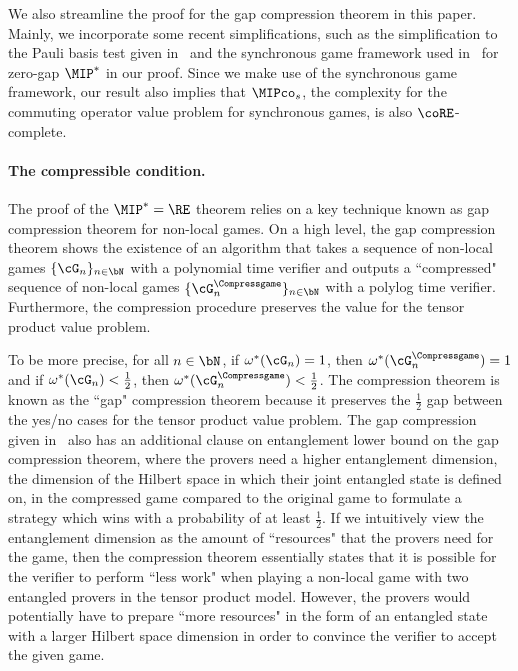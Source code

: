 We also streamline the proof for the gap compression theorem in this paper. Mainly, we incorporate some recent simplifications, such as the simplification to the Pauli basis test given in~\cite{delasalleSpectralGapStability2022} and the synchronous game framework used in~\cite{mousaviNonlocalGamesCompression2022} for zero-gap $\MIP^*$ in our proof. Since we make use of the synchronous game framework, our result also implies that $\MIPco_s$, the complexity for the commuting operator value problem for synchronous games, is also $\coRE$-complete. 

\paragraph{The compressible condition. }The proof of the $\MIP^*=\RE$ theorem relies on a key technique known as gap compression theorem for non-local games. On a high level, the gap compression theorem shows the existence of an algorithm that takes a sequence of non-local games $\{\cG_n\}_{n \in \bN}$ with a polynomial time verifier and outputs a ``compressed" sequence of non-local games $\{\cG_n^{\Compressgame}\}_{n \in \bN}$ with a polylog time verifier. Furthermore, the compression procedure preserves the value for the tensor product value problem. 

To be more precise, for all $n \in \bN$, if $\omega^*(\cG_n) = 1$, then $\omega^{*}(\cG_n^{\Compressgame})=1$ and if $\omega^*(\cG_n) < \frac{1}{2}$, then $\omega^{*}(\cG_n^{\Compressgame}) < \frac{1}{2}$. The compression theorem is known as the ``gap" compression theorem because it preserves the $\frac{1}{2}$ gap between the yes/no cases for the tensor product value problem. The gap compression given in~\cite{jiMIPRE2022a} also has an additional clause on entanglement lower bound on the gap compression theorem, where the provers need a higher entanglement dimension, the dimension of the Hilbert space in which their joint entangled state is defined on, in the compressed game compared to the original game to formulate a strategy which wins with a probability of at least $\frac{1}{2}$. If we intuitively view the entanglement dimension as the amount of ``resources" that the provers need for the game, then the compression theorem essentially states that it is possible for the verifier to perform ``less work" when playing a non-local game with two entangled provers in the tensor product model. However, the provers would potentially have to prepare ``more resources" in the form of an entangled state with a larger Hilbert space dimension in order to convince the verifier to accept the given game. 

